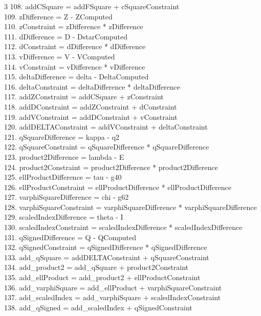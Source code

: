 \documentclass[10pt]{article}
\begin{document}
\begin{multicols}{3}
108. addCSquare = addFSquare + cSquareConstraint\\
109. zDifference = Z - ZComputed\\
110. zConstraint = zDifference * zDifference\\
111. dDifference = D - DstarComputed\\
112. dConstraint = dDifference * dDifference\\
113. vDifference = V - VComputed\\
114. vConstraint = vDifference * vDifference\\
115. deltaDifference = delta - DeltaComputed\\
116. deltaConstraint = deltaDifference * deltaDifference\\
117. addZConstraint = addCSquare + zConstraint\\
118. addDConstraint = addZConstraint + dConstraint\\
119. addVConstraint = addDConstraint + vConstraint\\
120. addDELTAConstraint = addVConstraint + deltaConstraint\\
121. qSquareDifference = kappa - q2\\
122. qSquareConstraint = qSquareDifference * qSquareDifference\\
123. product2Difference = lambda - E\\
124. product2Constraint = product2Difference * product2Difference\\
125. ellProductDifference = tau - g40\\
126. ellProductConstraint = ellProductDifference * ellProductDifference\\
127. varphiSquareDifference = chi - g62\\
128. varphiSquareConstraint = varphiSquareDifference * varphiSquareDifference\\
129. scaledIndexDifference = theta - I\\
130. scaledIndexConstraint = scaledIndexDifference * scaledIndexDifference\\
131. qSignedDifference = Q - QComputed\\
132. qSignedConstraint = qSignedDifference * qSignedDifference\\
133. add\_qSquare = addDELTAConstraint + qSquareConstraint\\
134. add\_product2 = add\_qSquare + product2Constraint\\
135. add\_ellProduct = add\_product2 + ellProductConstraint\\
136. add\_varphiSquare = add\_ellProduct + varphiSquareConstraint\\
137. add\_scaledIndex = add\_varphiSquare + scaledIndexConstraint\\
138. add\_qSigned = add\_scaledIndex + qSignedConstraint\\
\end{multicols}
\end{document}
